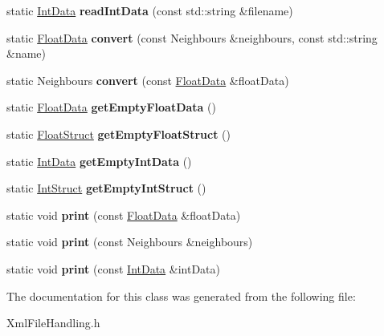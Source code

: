 \begin{DoxyCompactItemize}
\item 
\hypertarget{classXmlFileHandling_a25f8a2a5ee231bcb5666b8bf000b0ad9}{
static \hyperlink{structIntData}{IntData} {\bfseries readIntData} (const std::string \&filename)}
\label{classXmlFileHandling_a25f8a2a5ee231bcb5666b8bf000b0ad9}

\item 
\hypertarget{classXmlFileHandling_a128f79c646e14d25b6f57f802eda4ee3}{
static \hyperlink{structFloatData}{FloatData} {\bfseries convert} (const Neighbours \&neighbours, const std::string \&name)}
\label{classXmlFileHandling_a128f79c646e14d25b6f57f802eda4ee3}

\item 
\hypertarget{classXmlFileHandling_a97a99019b5cc19bbd1ab04df8bcf28c6}{
static Neighbours {\bfseries convert} (const \hyperlink{structFloatData}{FloatData} \&floatData)}
\label{classXmlFileHandling_a97a99019b5cc19bbd1ab04df8bcf28c6}

\item 
\hypertarget{classXmlFileHandling_ae07ac0b4b3cbb55bca86bae79f35e64a}{
static \hyperlink{structFloatData}{FloatData} {\bfseries getEmptyFloatData} ()}
\label{classXmlFileHandling_ae07ac0b4b3cbb55bca86bae79f35e64a}

\item 
\hypertarget{classXmlFileHandling_a64b628a648e84179e926f04137a17771}{
static \hyperlink{structFloatStruct}{FloatStruct} {\bfseries getEmptyFloatStruct} ()}
\label{classXmlFileHandling_a64b628a648e84179e926f04137a17771}

\item 
\hypertarget{classXmlFileHandling_a0c0f093dd78aa38073b85d246869be09}{
static \hyperlink{structIntData}{IntData} {\bfseries getEmptyIntData} ()}
\label{classXmlFileHandling_a0c0f093dd78aa38073b85d246869be09}

\item 
\hypertarget{classXmlFileHandling_ad8a29f40b89e15b4e0d7cc9c1861cc9b}{
static \hyperlink{structIntStruct}{IntStruct} {\bfseries getEmptyIntStruct} ()}
\label{classXmlFileHandling_ad8a29f40b89e15b4e0d7cc9c1861cc9b}

\item 
\hypertarget{classXmlFileHandling_a31378123d2bffacc7f9279e89c5b57eb}{
static void {\bfseries print} (const \hyperlink{structFloatData}{FloatData} \&floatData)}
\label{classXmlFileHandling_a31378123d2bffacc7f9279e89c5b57eb}

\item 
\hypertarget{classXmlFileHandling_ad8127e30b7b9a837f6b83dd1ae2dab43}{
static void {\bfseries print} (const Neighbours \&neighbours)}
\label{classXmlFileHandling_ad8127e30b7b9a837f6b83dd1ae2dab43}

\item 
\hypertarget{classXmlFileHandling_a2f93883efb8e3ecdbd476ae3cf4f6f59}{
static void {\bfseries print} (const \hyperlink{structIntData}{IntData} \&intData)}
\label{classXmlFileHandling_a2f93883efb8e3ecdbd476ae3cf4f6f59}

\end{DoxyCompactItemize}


The documentation for this class was generated from the following file:\begin{DoxyCompactItemize}
\item 
XmlFileHandling.h\end{DoxyCompactItemize}
